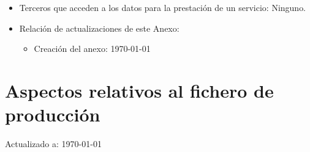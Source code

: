 \documentclass[a4paper,11pt,bibtotoc,noliststotoc]{scrbook}
\begin{document}
\begin{itemize}
\item Terceros que acceden a los datos para la prestación de un servicio: Ninguno.

\item Relación de actualizaciones de este Anexo: 

	\begin{itemize}
	\item Creación del anexo: \today
	\end{itemize}

\end{itemize}








\section{Aspectos relativos al fichero de producción}


Actualizado a: \today
\end{document}
